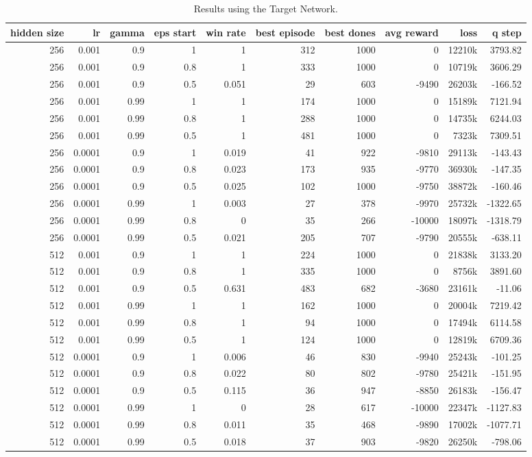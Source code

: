 \begin{table}[h]
	\centering
	\scriptsize
	\begin{tabular}{r r r r | r r r r r r}
		\toprule
			hidden size & lr & gamma & eps start & win rate & best episode & best dones & avg reward & loss & q step \\
		\midrule
			256 & 0.001 & 0.9 & 1 & 1 & 312 & 1000 & 0 & 12210k & 3793.82 \\
			256 & 0.001 & 0.9 & 0.8 & 1 & 333 & 1000 & 0 & 10719k & 3606.29 \\
			256 & 0.001 & 0.9 & 0.5 & 0.051 & 29 & 603 & -9490 & 26203k & -166.52 \\
			256 & 0.001 & 0.99 & 1 & 1 & 174 & 1000 & 0 & 15189k & 7121.94 \\
			256 & 0.001 & 0.99 & 0.8 & 1 & 288 & 1000 & 0 & 14735k & 6244.03 \\
			256 & 0.001 & 0.99 & 0.5 & 1 & 481 & 1000 & 0 & 7323k & 7309.51 \\
			256 & 0.0001 & 0.9 & 1 & 0.019 & 41 & 922 & -9810 & 29113k & -143.43 \\
			256 & 0.0001 & 0.9 & 0.8 & 0.023 & 173 & 935 & -9770 & 36930k & -147.35 \\
			256 & 0.0001 & 0.9 & 0.5 & 0.025 & 102 & 1000 & -9750 & 38872k & -160.46 \\
			256 & 0.0001 & 0.99 & 1 & 0.003 & 27 & 378 & -9970 & 25732k & -1322.65 \\
			256 & 0.0001 & 0.99 & 0.8 & 0 & 35 & 266 & -10000 & 18097k & -1318.79 \\
			256 & 0.0001 & 0.99 & 0.5 & 0.021 & 205 & 707 & -9790 & 20555k & -638.11 \\
			512 & 0.001 & 0.9 & 1 & 1 & 224 & 1000 & 0 & 21838k & 3133.20 \\
			512 & 0.001 & 0.9 & 0.8 & 1 & 335 & 1000 & 0 & 8756k & 3891.60 \\
			512 & 0.001 & 0.9 & 0.5 & 0.631 & 483 & 682 & -3680 & 23161k & -11.06 \\
			512 & 0.001 & 0.99 & 1 & 1 & 162 & 1000 & 0 & 20004k & 7219.42 \\
			512 & 0.001 & 0.99 & 0.8 & 1 & 94 & 1000 & 0 & 17494k & 6114.58 \\
			512 & 0.001 & 0.99 & 0.5 & 1 & 124 & 1000 & 0 & 12819k & 6709.36 \\
			512 & 0.0001 & 0.9 & 1 & 0.006 & 46 & 830 & -9940 & 25243k & -101.25 \\
			512 & 0.0001 & 0.9 & 0.8 & 0.022 & 80 & 802 & -9780 & 25421k & -151.95 \\
			512 & 0.0001 & 0.9 & 0.5 & 0.115 & 36 & 947 & -8850 & 26183k & -156.47 \\
			512 & 0.0001 & 0.99 & 1 & 0 & 28 & 617 & -10000 & 22347k & -1127.83 \\
			512 & 0.0001 & 0.99 & 0.8 & 0.011 & 35 & 468 & -9890 & 17002k & -1077.71 \\
			512 & 0.0001 & 0.99 & 0.5 & 0.018 & 37 & 903 & -9820 & 26250k & -798.06 \\
		\bottomrule
	\end{tabular}
	\caption{Results using the Target Network.}
	\label{targetnetwork_results}
\end{table}

